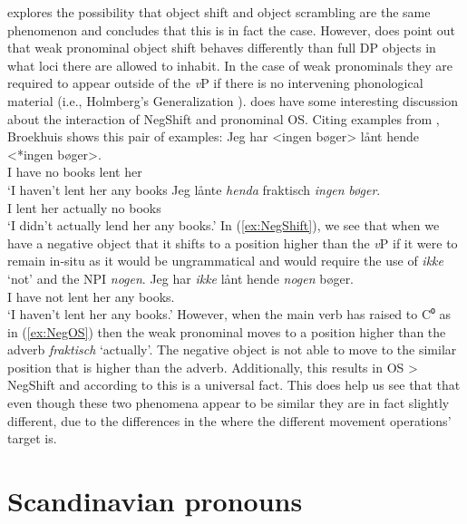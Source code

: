\documentclass[12pt, letterpaper]{article}
\begin{document}
\ea \cite{broekhuisUnificationObjectShift2020} explores the possibility that object shift and object scrambling are the same phenomenon and concludes that this is in fact the case.
\ex However, \citeauthor[417f]{broekhuisUnificationObjectShift2020} does point out that weak pronominal object shift behaves differently than full DP objects in what loci there are allowed to inhabit. In the case of weak pronominals they are required to appear outside of the \textit{v}P if there is no intervening phonological material (i.e., Holmberg's Generalization \cite{holmbergWordOrderSyntactic1986,holmbergRemarksHolmbergGeneralization1999}).
\ex \citeauthor{broekhuisUnificationObjectShift2020} does have some interesting discussion about the interaction of NegShift and pronominal OS. 
\ex Citing examples from \citet[163ff]{christensenInterfacesNegationSyntax2005}, Broekhuis shows this pair of examples:
	\ea \label{ex:NegShift}
	\gll Jeg har <ingen bøger> lånt hende <*ingen bøger>.\\
	I have no books lent her\\
	\glt `I haven't lent her any books
	\ex \label{ex:NegOS}
	\gll Jeg lånte \textit{henda} fraktisch \textit{ingen} \textit{bøger}.\\
	I lent her actually no books\\
	\glt `I didn't actually lend her any books.'
	\z
\ex In (\ref{ex:NegShift}), we see that when we have a negative object that it shifts to a position higher than the \textit{v}P if it were to remain in-situ as it would be ungrammatical and would require the use of \textit{ikke} `not' and the NPI \textit{nogen}.
	\ea
	\gll Jeg har \textit{ikke} lånt hende \textit{nogen} bøger.\\
	I have not lent her any books.\\
	\glt `I haven't lent her any books.'
	\z
\ex However, when the main verb has raised to C⁰ as in (\ref{ex:NegOS}) then the weak pronominal moves to a position higher than the adverb \textit{fraktisch} `actually'. The negative object is not able to move to the similar position that is higher than the adverb. Additionally, this results in OS > NegShift and according to \citeauthor{broekhuisUnificationObjectShift2020} this is a universal fact.
\ex This does help us see that that even though these two phenomena appear to be similar they are in fact slightly different, due to the differences in the where the different movement operations' target is.
\z 

\section{Scandinavian pronouns} \label{sec:PRONOUNS}
\end{document}
